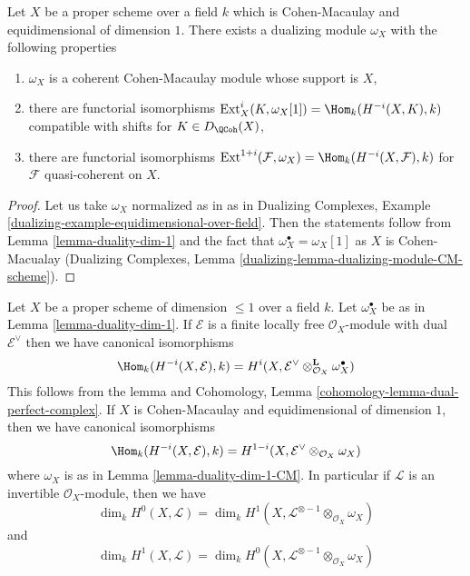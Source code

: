 \begin{lemma}
\label{lemma-duality-dim-1-CM}
Let $X$ be a proper scheme over a field $k$ which is Cohen-Macaulay
and equidimensional of dimension $1$. There exists a dualizing module
$\omega_X$ with the following properties
\begin{enumerate}
\item $\omega_X$ is a coherent Cohen-Macaulay module whose support is $X$,
\item there are functorial isomorphisms
$\text{Ext}^i_X(K, \omega_X[1]) = \Hom_k(H^{-i}(X, K), k)$
compatible with shifts for $K \in D_\QCoh(X)$,
\item there are functorial isomorphisms
$\text{Ext}^{1 + i}(\mathcal{F}, \omega_X) = \Hom_k(H^{-i}(X, \mathcal{F}), k)$
for $\mathcal{F}$ quasi-coherent on $X$.
\end{enumerate}
\end{lemma}

\begin{proof}
Let us take $\omega_X$ normalized as in
as in Dualizing Complexes, Example
\ref{dualizing-example-equidimensional-over-field}.
Then the statements follow from
Lemma \ref{lemma-duality-dim-1}
and the fact that $\omega_X^\bullet = \omega_X[1]$
as $X$ is Cohen-Macualay (Dualizing Complexes, Lemma
\ref{dualizing-lemma-dualizing-module-CM-scheme}).
\end{proof}

\begin{remark}
\label{remark-rework-duality-locally-free}
Let $X$ be a proper scheme of dimension $\leq 1$ over a field $k$.
Let $\omega_X^\bullet$ be as in Lemma \ref{lemma-duality-dim-1}.
If $\mathcal{E}$ is a finite locally free $\mathcal{O}_X$-module
with dual $\mathcal{E}^\vee$ then we have canonical isomorphisms
$$
\Hom_k(H^{-i}(X, \mathcal{E}), k) =
H^i(X, \mathcal{E}^\vee \otimes_{\mathcal{O}_X}^\mathbf{L} \omega_X^\bullet)
$$
This follows from the lemma and
Cohomology, Lemma \ref{cohomology-lemma-dual-perfect-complex}.
If $X$ is Cohen-Macaulay and equidimensional of dimension $1$, then
we have canonical isomorphisms
$$
\Hom_k(H^{-i}(X, \mathcal{E}), k) =
H^{1 - i}(X, \mathcal{E}^\vee \otimes_{\mathcal{O}_X} \omega_X)
$$
where $\omega_X$ is as in Lemma \ref{lemma-duality-dim-1-CM}. In particular
if $\mathcal{L}$ is an invertible $\mathcal{O}_X$-module, then we have
$$
\dim_k H^0(X, \mathcal{L}) =
\dim_k H^1(X, \mathcal{L}^{\otimes -1} \otimes_{\mathcal{O}_X} \omega_X)
$$
and
$$
\dim_k H^1(X, \mathcal{L}) =
\dim_k H^0(X, \mathcal{L}^{\otimes -1} \otimes_{\mathcal{O}_X} \omega_X)
$$
\end{remark}

